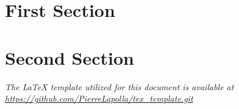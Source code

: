 \documentclass[10pt]{article}
\title{\mytitle}
\author{\myauthor}
\date{\today}
\begin{document}
    \maketitle
    \tableofcontents
    \newpage

    \section{First Section}\label{sec:first-section}
    


    \section{Second Section}\label{sec:second-section}
    

    \vfill
    \begin{center}
        \textit{The \LaTeX{} template utilized for this document is available at \url{https://github.com/PierreLapolla/tex_template.git}}
    \end{center}
\end{document}
